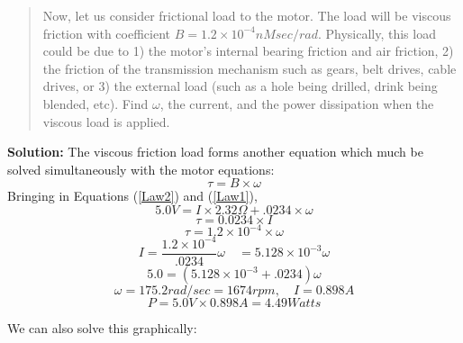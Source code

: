 \begin{quotation}
Now, let us consider frictional load to the motor.
The load will be viscous friction with coefficient
$B = 1.2\times 10^{-4} nMsec/rad$. Physically, this
load could be due to 1) the motor's internal
bearing friction and air friction, 2) the friction of
the transmission mechanism such as gears,
belt drives, cable drives, or 3) the external load (such
 as a hole being drilled, drink being
blended, etc).   Find $\omega$, the current, and the power
dissipation when the viscous load
is applied.
\end{quotation}
{\bf Solution:}
The viscous friction load forms another equation which much be solved simultaneously with the
motor equations:
\[
\tau = B\times \omega
\]
Bringing in Equations (\ref{Law2}) and (\ref{Law1}),
\[
5.0V = I\times 2.32\Omega + .0234 \times \omega
\]
\[
\tau = 0.0234\times I
\]
\[
\tau = 1.2\times 10^{-4} \times \omega
\]
\[
I = \frac{1.2\times 10^{-4}}{.0234} \omega \quad = 5.128\times10^{-3}\omega
\]
\[
5.0 = (5.128\times 10^{-3}+ .0234)\omega
\]
\[
\omega = 175.2 rad/sec = 1674 rpm, \quad  I = 0.898A
\]
\[
P = 5.0V\times 0.898A = 4.49 Watts
\]

We can also solve this graphically:


\begin{center}
\end{center}


